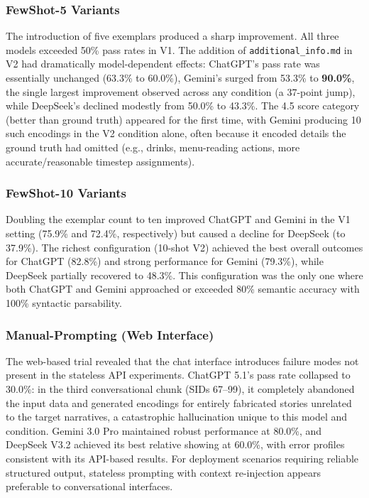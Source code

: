 \documentclass[runningheads]{llncs}
\begin{document}
\subsubsection{FewShot-5 Variants}

The introduction of five exemplars produced a sharp improvement.  All three
models exceeded 50\% pass rates in V1.  The addition of
\texttt{additional\_info.md} in V2 had dramatically model-dependent effects:
ChatGPT's pass rate was essentially unchanged (63.3\% to 60.0\%), Gemini's
surged from 53.3\% to \textbf{90.0\%}, the single largest improvement
observed across any condition (a 37-point jump), while DeepSeek's declined
modestly from 50.0\% to 43.3\%.  The 4.5 score category (better than ground
truth) appeared for the first time, with Gemini producing 10 such encodings
in the V2 condition alone, often because it encoded details the ground truth
had omitted (e.g., drinks, menu-reading actions, more accurate/reasonable timestep
assignments).

\subsubsection{FewShot-10 Variants}

Doubling the exemplar count to ten improved ChatGPT and Gemini in the V1
setting (75.9\% and 72.4\%, respectively) but caused a decline for DeepSeek
(to 37.9\%).  The richest configuration (10-shot V2) achieved the
best overall outcomes for ChatGPT (82.8\%) and strong performance for Gemini
(79.3\%), while DeepSeek partially recovered to 48.3\%.  This configuration
was the only one where both ChatGPT and Gemini approached or exceeded 80\%
semantic accuracy with 100\% syntactic parsability.

\subsubsection{Manual-Prompting (Web Interface)}

The web-based trial revealed that the chat interface introduces failure modes
not present in the stateless API experiments.  ChatGPT 5.1's pass rate
collapsed to 30.0\%: in the third conversational chunk (SIDs 67--99), it
completely abandoned the input data and generated encodings for entirely
fabricated stories unrelated to the target narratives, a catastrophic
hallucination unique to this model and condition.  Gemini 3.0 Pro maintained
robust performance at 80.0\%, and DeepSeek V3.2 achieved its best relative
showing at 60.0\%, with error profiles consistent with its API-based results.
For deployment scenarios requiring reliable structured output, stateless
prompting with context re-injection appears preferable to conversational
interfaces.
\end{document}
